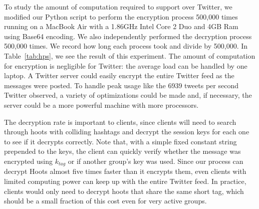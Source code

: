 To study the amount of computation required to support \hoot over
Twitter, we modified our Python script to perform the encryption process 
500,000 times running on a MacBook
Air with a 1.86GHz Intel Core 2 Duo and 4GB Ram using Base64 encoding. We 
also independently performed the decryption process 500,000 times. We 
record how long each process took and divide by 500,000. In
Table~\ref{tab:hps}, we see the result of this experiment. The amount of
computation for encryption is negligible for Twitter: the average load
can be handled by one laptop. A Twitter server could easily encrypt the
entire Twitter feed as the messages were posted. To handle peak usage
like the 6939 tweets per second Twitter observed, a variety of
optimizations could be made and, if necessary, the server could be a
more powerful machine with more processors.

The decryption rate is important to clients, since clients will need to
search through hoots with colliding hashtags and decrypt the session
keys for each one to see if it decrypts correctly. Note that, with a
simple fixed constant string prepended to the keys, the client can
quickly verify whether the message was encrypted using $k_{tag}$ or if
another group's key was used. Since our process can decrypt Hoots almost
five times faster than it encrypts them, even clients with limited
computing power can keep up with the entire Twitter feed. In practice,
clients would only need to decrypt hoots that share the same short tag,
which should be a small fraction of this cost even for very active
groups.




